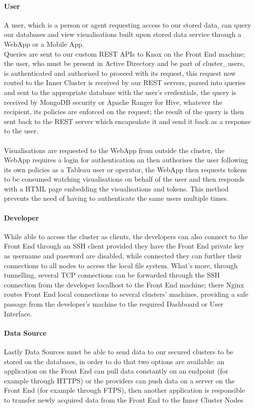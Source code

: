 \paragraph{User}
A user, which is a person or agent requesting access to our stored data, can query our databases and view visualisations built upon stored data service through a WebApp or a Mobile App.\\
Queries are sent to our custom REST APIs to Knox on the Front End machine; the user, who must be present in Active Directory and be part of cluster\_users, is authenticated and authorised to proceed with its request, this request now routed to the Inner Cluster is received by our REST servers, parsed into queries and sent to the appropriate database with the user's credentials, the query is received by MongoDB security or Apache Ranger for Hive, whatever the recipient, its policies are enforced on the request; the result of the query is then sent back to the REST server which encapsulate it and send it back as a response to the user.
\\ \\
Visualisations are requested to the WebApp from outside the cluster, the WebApp requires a login for authentication an then authorises the user following its own policies as a Tableau user or operator, the WebApp then requests tokens to be consumed watching visualisations on behalf of the user and then responds with a HTML page embedding the visualisations and tokens. This method prevents the need of having to authenticate the same users multiple times.
\paragraph{Developer}
While able to access the cluster as clients, the developers can also connect to the Front End through an SSH client provided they have the Front End private key as username and password are disabled, while connected they can further their connections to all nodes to access the local file system. What's more, through tunnelling, several TCP connections can be forwarded through the SSH connection from the developer localhost to the Front End machine; there Nginx routes Front End local connections to several clusters' machines, providing a safe passage from the developer's machine to the required Dashboard or User Interface.
\paragraph{Data Source}
Lastly Data Sources must be able to send data to our secured clusters to be stored on the databases, in order to do that two options are available: an application on the Front End can pull data constantly on an endpoint (for example through HTTPS) or the providers can push data on a server on the Front End (for example through FTPS), then another application is responsible to transfer newly acquired data from the Front End to the Inner Cluster Nodes